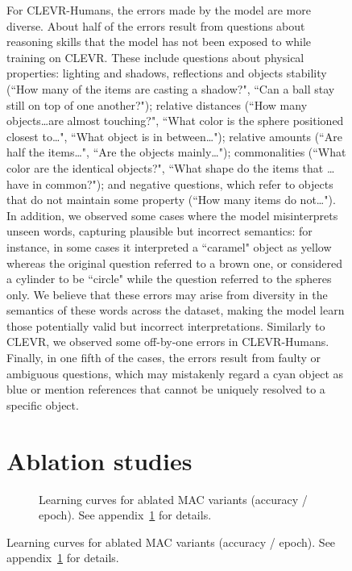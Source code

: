 \documentclass[fleqn]{article}
\newcommand{\appref}[1]{appendix~\ref{sec:#1}}
\begin{document}
\begin{figure}[t]
\begin{minipage}{0.55\textwidth}
For CLEVR-Humans, the errors made by the model are more diverse. About half of the errors result from questions about reasoning skills that the model has not been exposed to while training on CLEVR. These include questions about physical properties: lighting and shadows, reflections and objects stability (``How many of the items are casting a shadow?", ``Can a ball stay still on top of one another?"); relative distances (``How many objects\ldots are almost touching?", ``What color is the sphere positioned closest to\ldots", ``What object is in between\ldots"); relative amounts (``Are half the items\ldots", ``Are the objects mainly\ldots"); commonalities (``What color are the identical objects?", ``What shape do the items that \ldots have in common?"); and negative questions, which refer to objects that do not maintain some property (``How many items do not\ldots"). In addition, we observed some cases where the model misinterprets unseen words, capturing plausible but incorrect semantics: for instance, in some cases it interpreted a ``caramel" object as yellow whereas the original question referred to a brown one, or considered a cylinder to be ``circle" while the question referred to the spheres only. We believe that these errors may arise from diversity in the semantics of these words across the dataset, making the model learn those potentially valid but incorrect interpretations. Similarly to CLEVR, we observed some off-by-one errors in CLEVR-Humans. Finally, in one fifth of the cases, the errors result from faulty or ambiguous questions, which may mistakenly regard a cyan object as blue or mention references that cannot be uniquely resolved to a specific object.

\section{Ablation studies}
\label{sec:ablationsSupp} 

\begin{figure}[t]
\centering
{}
\hfill
{}
\hfill
{}
\hfill
{}
\hfill
{}
\caption{Learning curves for ablated MAC variants (accuracy / epoch). See \appref{ablationsSupp} for details.}
\label{fig:ablationsSupp}
\end{figure}


\end{minipage}
\end{figure}
\end{document}
